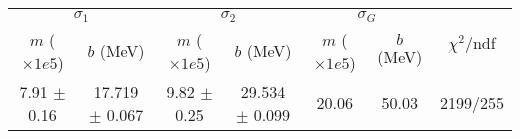 \begin{tabular}{cc|cc|cc||c}
\multicolumn{2}{c|}{$\sigma_1$} & \multicolumn{2}{|c}{$\sigma_2$} & \multicolumn{2}{|c}{$\sigma_G$}  & \multirow{2}{*}{$\chi^2/$ndf}\\
$m$ ($\times1e5$) & $b$ (MeV) & $m$ ($\times1e5$) & $b$ (MeV) & $m$ ($\times1e5$) & $b$ (MeV) & \\
\hline
7.91 $\pm$ 0.16 & 17.719 $\pm$ 0.067 & 9.82 $\pm$ 0.25 & 29.534 $\pm$ 0.099 & 20.06 & 50.03 & 2199/255\\
\end{tabular}
